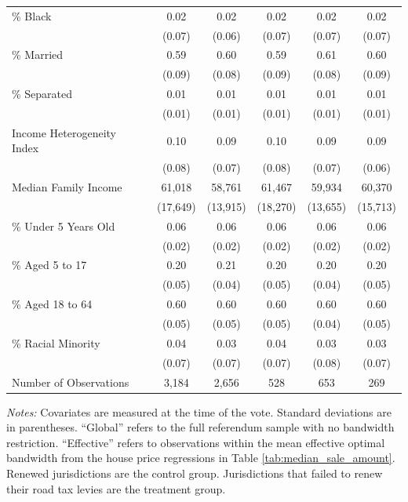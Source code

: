 \begin{table}[H]
\begin{tabular}{>{\raggedright\arraybackslash}p{3.4cm}ccccc}
    \% Black & 0.02 & 0.02 & 0.02 & 0.02 & 0.02 \\
                & (0.07) & (0.06) & (0.07) & (0.07) & (0.07) \\
    \% Married & 0.59 & 0.60 & 0.59 & 0.61 & 0.60 \\
                & (0.09) & (0.08) & (0.09) & (0.08) & (0.09) \\
    \% Separated & 0.01 & 0.01 & 0.01 & 0.01 & 0.01 \\
                    & (0.01) & (0.01) & (0.01) & (0.01) & (0.01) \\
    Income Heterogeneity Index & 0.10 & 0.09 & 0.10 & 0.09 & 0.09 \\
                                & (0.08) & (0.07) & (0.08) & (0.07) & (0.06) \\
    Median Family Income & 61,018 & 58,761 & 61,467 & 59,934 & 60,370 \\
                            & (17,649) & (13,915) & (18,270) & (13,655) & (15,713) \\
    \% Under 5 Years Old & 0.06 & 0.06 & 0.06 & 0.06 & 0.06 \\
                            & (0.02) & (0.02) & (0.02) & (0.02) & (0.02) \\
    \% Aged 5 to 17 & 0.20 & 0.21 & 0.20 & 0.20 & 0.20 \\
                    & (0.05) & (0.04) & (0.05) & (0.04) & (0.05) \\
    \% Aged 18 to 64 & 0.60 & 0.60 & 0.60 & 0.60 & 0.60 \\
                        & (0.05) & (0.05) & (0.05) & (0.04) & (0.05) \\
    \% Racial Minority & 0.04 & 0.03 & 0.04 & 0.03 & 0.03 \\
                        & (0.07) & (0.07) & (0.07) & (0.08) & (0.07) \\
    Number of Observations & 3,184 & 2,656 & 528 & 653 & 269 \\
    \hline
    \end{tabular}
    \begin{minipage}{0.95\textwidth}
        \vspace{0.2em}
        \footnotesize \textit{Notes:} Covariates are measured at the time of the vote. Standard deviations are in parentheses. ``Global'' refers to the full referendum sample with no bandwidth restriction. ``Effective'' refers to observations within the mean effective optimal bandwidth from the house price regressions in Table \ref{tab:median_sale_amount}. Renewed jurisdictions are the control group. Jurisdictions that failed to renew their road tax levies are the treatment group.
    \end{minipage}
    \endgroup
\end{table}










